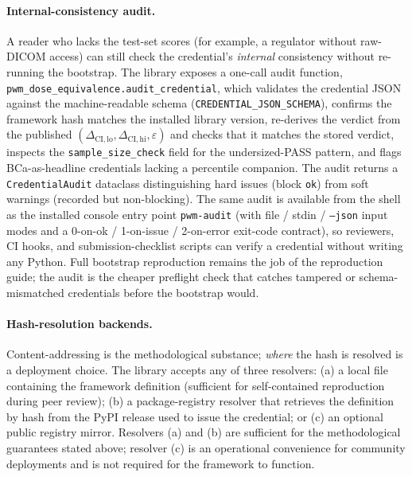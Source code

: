 \documentclass[twoside,11pt]{article}
\begin{document}
\paragraph{Internal-consistency audit.} A reader who lacks the test-set scores (for example, a regulator without raw-DICOM access) can still check the credential's \emph{internal} consistency without re-running the bootstrap. The library exposes a one-call audit function, \texttt{pwm\_dose\_equivalence.audit\_credential}, which validates the credential JSON against the machine-readable schema (\texttt{CREDENTIAL\_JSON\_SCHEMA}), confirms the framework hash matches the installed library version, re-derives the verdict from the published $(\Delta_{\mathrm{CI},\mathrm{lo}}, \Delta_{\mathrm{CI},\mathrm{hi}}, \varepsilon)$ and checks that it matches the stored verdict, inspects the \texttt{sample\_size\_check} field for the undersized-PASS pattern, and flags BCa-as-headline credentials lacking a percentile companion. The audit returns a \texttt{CredentialAudit} dataclass distinguishing hard issues (block \texttt{ok}) from soft warnings (recorded but non-blocking). The same audit is available from the shell as the installed console entry point \texttt{pwm-audit} (with file / stdin / \texttt{--json} input modes and a 0-on-ok / 1-on-issue / 2-on-error exit-code contract), so reviewers, CI hooks, and submission-checklist scripts can verify a credential without writing any Python. Full bootstrap reproduction remains the job of the reproduction guide; the audit is the cheaper preflight check that catches tampered or schema-mismatched credentials before the bootstrap would.

\paragraph{Hash-resolution backends.} Content-addressing is the methodological substance; \emph{where} the hash is resolved is a deployment choice. The library accepts any of three resolvers: (a) a local file containing the framework definition (sufficient for self-contained reproduction during peer review); (b) a package-registry resolver that retrieves the definition by hash from the PyPI release used to issue the credential; or (c) an optional public registry mirror. Resolvers (a) and (b) are sufficient for the methodological guarantees stated above; resolver (c) is an operational convenience for community deployments and is not required for the framework to function.

\end{document}
